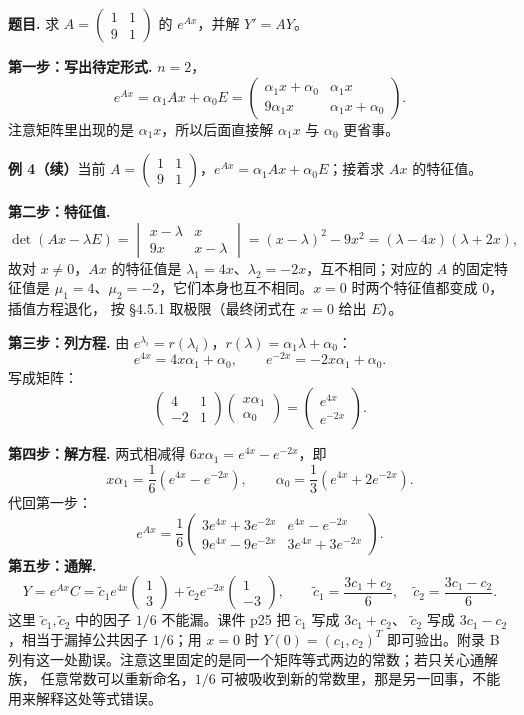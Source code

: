\documentclass[11pt]{ctexart}
\newcommand{\pmat}[1]{\begin{pmatrix}#1\end{pmatrix}}
\newcommand{\Ax}{Ax}
\begin{document}

\textbf{题目.} 求 $A=\pmat{1&1\\9&1}$ 的 $e^{Ax}$，并解 $Y'=AY$。

\textbf{第一步：写出待定形式.} $n=2$，
\[
e^{Ax}=\alpha_1\Ax+\alpha_0E
=\pmat{\alpha_1x+\alpha_0&\alpha_1x\\9\alpha_1x&\alpha_1x+\alpha_0}.
\]
注意矩阵里出现的是 $\alpha_1x$，所以后面直接解 $\alpha_1x$ 与 $\alpha_0$ 更省事。

\clearpage
\noindent\textbf{例 4（续）}\quad 当前 $A=\pmat{1&1\\9&1}$，$e^{Ax}=\alpha_1\Ax+\alpha_0E$；接着求
$\Ax$ 的特征值。

\textbf{第二步：特征值.}
\[
\det(\Ax-\lambda E)
=\begin{vmatrix}x-\lambda&x\\9x&x-\lambda\end{vmatrix}
=(x-\lambda)^2-9x^2=(\lambda-4x)(\lambda+2x),
\]
故对 $x\ne0$，$\Ax$ 的特征值是 $\lambda_1=4x$、$\lambda_2=-2x$，互不相同；对应的 $A$ 的固定特征值是
$\mu_1=4$、$\mu_2=-2$，它们本身也互不相同。$x=0$ 时两个特征值都变成 $0$，插值方程退化，
按 §4.5.1 取极限（最终闭式在 $x=0$ 给出 $E$）。

\textbf{第三步：列方程.} 由 $e^{\lambda_i}=r(\lambda_i)$，$r(\lambda)=\alpha_1\lambda+\alpha_0$：
\[
e^{4x}=4x\alpha_1+\alpha_0,\qquad
e^{-2x}=-2x\alpha_1+\alpha_0 .
\]
写成矩阵：
\[
\pmat{4&1\\-2&1}\pmat{x\alpha_1\\\alpha_0}=\pmat{e^{4x}\\e^{-2x}}.
\]

\textbf{第四步：解方程.}
两式相减得 $6x\alpha_1=e^{4x}-e^{-2x}$，即
\[
x\alpha_1=\frac16\left(e^{4x}-e^{-2x}\right),\qquad
\alpha_0=\frac13\left(e^{4x}+2e^{-2x}\right).
\]
代回第一步：
\[
e^{Ax}=\frac16\pmat{
3e^{4x}+3e^{-2x} & e^{4x}-e^{-2x}\\
9e^{4x}-9e^{-2x} & 3e^{4x}+3e^{-2x}} .
\]
\textbf{第五步：通解.}
\[
Y=e^{Ax}C
=\tilde c_1e^{4x}\pmat{1\\3}+\tilde c_2e^{-2x}\pmat{1\\-3},
\qquad
\tilde c_1=\frac{3c_1+c_2}{6},\quad
\tilde c_2=\frac{3c_1-c_2}{6}.
\]
这里 $\tilde c_1,\tilde c_2$ 中的因子 $1/6$ 不能漏。课件 p25 把 $\tilde c_1$ 写成 $3c_1+c_2$、
$\tilde c_2$ 写成 $3c_1-c_2$，相当于漏掉公共因子 $1/6$；用 $x=0$ 时 $Y(0)=(c_1,c_2)^T$
即可验出。附录 B 列有这一处勘误。注意这里固定的是同一个矩阵等式两边的常数；若只关心通解族，
任意常数可以重新命名，$1/6$ 可被吸收到新的常数里，那是另一回事，不能用来解释这处等式错误。
\end{document}
